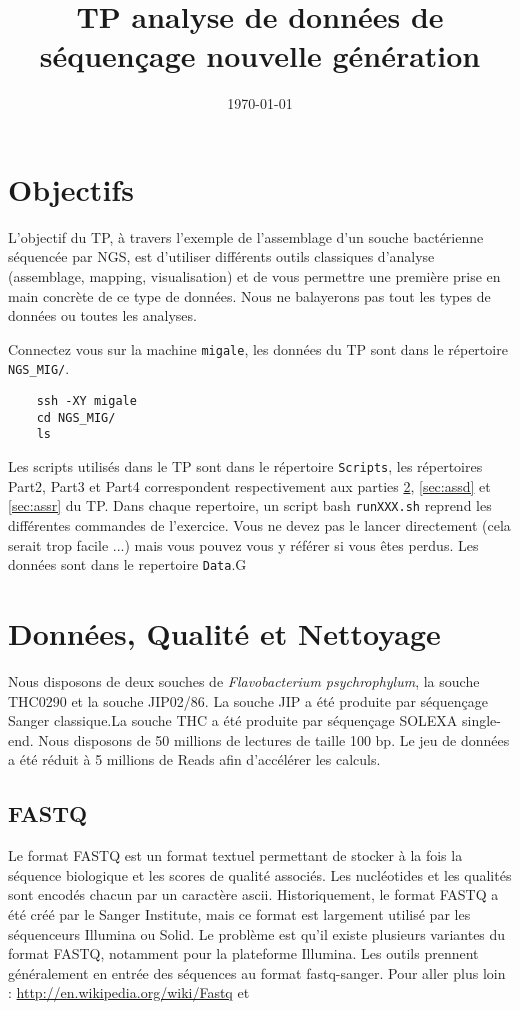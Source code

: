 \documentclass[a4paper,12pt]{article}
\title{TP analyse de données de séquençage nouvelle génération}
\date{\today}
\begin{document}
 

\maketitle 
\section{Objectifs} 
L'objectif du TP, à travers l'exemple de l'assemblage d'un souche bactérienne séquencée par NGS, est d'utiliser différents outils classiques d'analyse (assemblage, mapping, visualisation) et de vous permettre une première prise en main concrète de ce type de données. Nous ne balayerons pas tout les types de données ou toutes les analyses.

Connectez vous sur la machine \verb=migale=, les données du TP sont dans le répertoire \verb=NGS_MIG/=.
\begin{lstlisting}
	ssh -XY migale
	cd NGS_MIG/
	ls
\end{lstlisting}



Les scripts utilisés dans le TP sont dans le répertoire \verb=Scripts=, les répertoires Part2, Part3 et Part4 correspondent respectivement aux parties \ref{sec:qual}, \ref{sec:assd} et \ref{sec:assr} du TP. Dans chaque repertoire, un script bash \verb=runXXX.sh= reprend les différentes commandes de l'exercice. Vous ne devez pas le lancer directement (cela serait trop facile ...) mais vous pouvez vous y référer si vous êtes perdus. Les données sont dans le repertoire \verb=Data=.G


\section{Données, Qualité et Nettoyage}
\label{sec:qual}
Nous disposons de deux souches de \textit{Flavobacterium psychrophylum}, la souche THC0290 et la souche JIP02/86. La souche JIP a été produite par séquençage Sanger classique.La souche THC a été produite par séquençage SOLEXA single-end. Nous disposons de 50 millions de lectures de taille 100 bp. Le jeu de données a été réduit à 5 millions de Reads afin d'accélérer les calculs.

\subsection{FASTQ}
\label{sec:fastq}
Le format FASTQ est un format textuel permettant de stocker à la fois la séquence biologique et les scores de qualité associés. Les nucléotides et les qualités sont encodés chacun par un caractère ascii. Historiquement, le format FASTQ a été créé par le Sanger Institute, mais ce format est largement utilisé par les séquenceurs Illumina ou Solid. Le problème est qu'il existe plusieurs variantes du format FASTQ, notamment pour la plateforme Illumina. Les outils prennent généralement en entrée des séquences au format fastq-sanger.
Pour aller plus loin : \url{http://en.wikipedia.org/wiki/Fastq} et \cite{Cock:2009p1945} 
\end{document}
